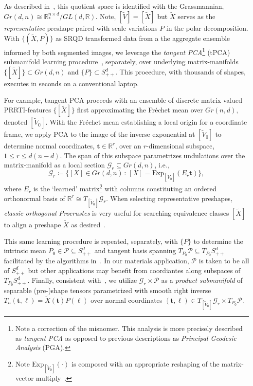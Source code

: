 \documentclass[pdflatex,iicol]{sn-jnl}%
\theoremstyle{thmstyleone}%
\theoremstyle{thmstyletwo}%
\theoremstyle{thmstylethree}%
\begin{document}
As described in~\cite{absil2008optimization}, this quotient space is identified with the Grassmannian, $Gr(d,n) \cong \mathbb{R}^{n \times d}_*/GL(d, \mathbb{R})$. Note, $[\widetilde{V}] = [\widetilde{X}]$ but $\widetilde{X}$ serves as the \textit{representative} preshape paired with scale variations $P$ in the polar decomposition. With $\lbrace (\widetilde{X}, P)\rbrace$ as SRQD transformed data from a the aggregate ensemble informed by both segmented images, we leverage the \textit{tangent PCA}\footnote{Note a correction of the misnomer. This analysis is more precisely described as \textit{tangent PCA} as opposed to previous descriptions as \textit{Principal Geodesic Analysis} (PGA).} (tPCA) submanifold learning procedure~\cite{grey2023separable,fletcher2004principal}, separately, over underlying matrix-manifolds $\lbrace [\widetilde{X}] \rbrace \subset Gr(d,n)$ and $\lbrace P \rbrace \subset S^d_{++}$.  This procedure, with thousands of shapes, executes in seconds on a conventional laptop.

For example, tangent PCA proceeds with an ensemble of discrete matrix-valued PRRTI-features $\lbrace [\widetilde{X}] \rbrace$ first approximating the Fr\'echet mean over $Gr(n,d)$, denoted $[\widetilde{V}_0]$. With the Fr\'echet mean establishing a local origin for a coordinate frame, we apply PCA to the image of the inverse exponential at $[\widetilde{V}_0]$ to determine normal coordinates, $\boldsymbol{t}\in \mathbb{R}^r$, over an $r$-dimensional subspace, $1\leq r\leq d(n-d)$. The span of this subspace parametrizes undulations over the matrix-manifold as a local section $\mathcal{G}_r \subseteq Gr(d,n)$, i.e.,
\begin{equation}
    \mathcal{G}_r \coloneqq \lbrace [X] \in Gr(d,n) \,:\, [X] = \text{Exp}_{[\widetilde{V}_0]}(E_r\boldsymbol{t}) \rbrace,
\end{equation}
where $E_r$ is the `learned' matrix\footnote{Note $\text{Exp}_{[\widetilde{V}_0]}(\cdot)$ is composed with an appropriate reshaping of the matrix-vector multiply~\cite{grey2023separable}.} with columns constituting an ordered orthonormal basis of $\mathbb{R}^r \cong T_{[\widetilde{V}_0]}\mathcal{G}_r$. When selecting representative preshapes, \textit{classic orthogonal Procrustes} is very useful for searching equivalence classes $[\widetilde{X}]$ to align a preshape $\widetilde{X}$ as desired~\cite{grey2023separable}.

This same learning procedure is repeated, separately, with $\lbrace P \rbrace$ to determine the intrinsic mean $P_0 \in \mathcal{P} \subseteq S^d_{++}$ and tangent basis spanning $T_{P_0}\mathcal{P} \subseteq T_{P_0}S^d_{++}$ facilitated by the algorithms in~\cite{fletcher2003statistics}. In our materials application, $\mathcal{P}$ is taken to be all of $S^d_{++}$ but other applications may benefit from coordiantes along subspaces of $T_{P_0}S^d_{++}$. Finally, consistent with~\cite{grey2023separable}, we utilize $\mathcal{G}_r \times \mathcal{P}$ as a \emph{product submanifold} of separable (pre-)shape tensors parametrized with smooth right inverse $T_n(\boldsymbol{t},\boldsymbol{\ell}) = \widetilde{X}(\boldsymbol{t})P(\boldsymbol{\ell})$ over normal coordinates $(\boldsymbol{t},\boldsymbol{\ell}) \in T_{[\widetilde{V}_0]}\mathcal{G}_r \times T_{P_0}\mathcal{P}$.
\end{document}
